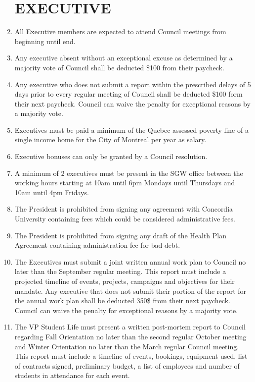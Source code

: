 \documentclass[oneside]{book}
\begin{document}
\begin{enumerate}
\part{\label{EXECUTIVE}EXECUTIVE }
\item All Executive members are expected to attend Council meetings from
beginning until end. 
\item Any executive absent without an exceptional excuse as determined by
a majority vote of Council shall be deducted \$100 from their paycheck. 
\item Any executive who does not submit a report within the prescribed delays
of 5 days prior to every regular meeting of Council shall be deducted
\$100 form their next paycheck. Council can waive the penalty for
exceptional reasons by a majority vote. 
\item Executives must be paid a minimum of the Quebec assessed poverty line
of a single income home for the City of Montreal per year as salary. 
\item Executive bonuses can only be granted by a Council resolution. 
\item A minimum of 2 executives must be present in the SGW office between
the working hours starting at 10am until 6pm Mondays until Thursdays
and 10am until 4pm Fridays. 
\item The President is prohibited from signing any agreement with Concordia
University containing fees which could be considered administrative
fees. 
\item The President is prohibited from signing any draft of the Health Plan
Agreement containing administration fee for bad debt. 
\item The Executives must submit a joint written annual work plan to Council
no later than the September regular meeting. This report must include
a projected timeline of events, projects, campaigns and objectives
for their mandate. Any executive that does not submit their portion
of the report for the annual work plan shall be deducted 350\$ from
their next paycheck. Council can waive the penalty for exceptional
reasons by a majority vote.
\item The VP Student Life must present a written post-mortem report to Council
regarding Fall Orientation no later than the second regular October
meeting and Winter Orientation no later than the March regular Council
meeting. This report must include a timeline of events, bookings,
equipment used, list of contracts signed, preliminary budget, a list
of employees and number of students in attendance for each event.

\end{enumerate}
\end{document}
